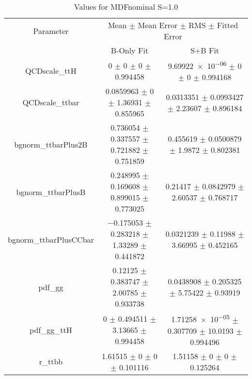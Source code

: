 \begin{table}
\centering
\caption{Values for MDFnominal S=1.0}
\begin{tabular}{ccc}
\toprule
Parameter & \multicolumn{2}{c}{Mean $\pm$ Mean Error $\pm$ RMS $\pm$ Fitted Error}\\
 & B-Only Fit & S+B Fit\\
\midrule
QCDscale\_ttH & \num{0} $\pm$ \num{0} $\pm$ \num{0} $\pm$ \num{0.994458} & \num{9.69922e-06} $\pm$ \num{0} $\pm$ \num{0} $\pm$ \num{0.994168}\\
QCDscale\_ttbar & \num{0.0859963} $\pm$ \num{0} $\pm$ \num{1.36931} $\pm$ \num{0.855965} & \num{0.0313351} $\pm$ \num{0.0993427} $\pm$ \num{2.23607} $\pm$ \num{0.896184}\\
bgnorm\_ttbarPlus2B & \num{0.736054} $\pm$ \num{0.337557} $\pm$ \num{0.721882} $\pm$ \num{0.751859} & \num{0.455619} $\pm$ \num{0.0500879} $\pm$ \num{1.9872} $\pm$ \num{0.802381}\\
bgnorm\_ttbarPlusB & \num{0.248995} $\pm$ \num{0.169608} $\pm$ \num{0.899015} $\pm$ \num{0.773025} & \num{0.21417} $\pm$ \num{0.0842979} $\pm$ \num{2.60537} $\pm$ \num{0.768717}\\
bgnorm\_ttbarPlusCCbar & \num{-0.175053} $\pm$ \num{0.283218} $\pm$ \num{1.33289} $\pm$ \num{0.441872} & \num{0.0321239} $\pm$ \num{0.11988} $\pm$ \num{3.66995} $\pm$ \num{0.452165}\\
pdf\_gg & \num{0.12125} $\pm$ \num{0.383747} $\pm$ \num{2.00785} $\pm$ \num{0.933738} & \num{0.0438908} $\pm$ \num{0.205325} $\pm$ \num{5.75422} $\pm$ \num{0.93919}\\
pdf\_gg\_ttH & \num{0} $\pm$ \num{0.494511} $\pm$ \num{3.13665} $\pm$ \num{0.994458} & \num{1.71258e-05} $\pm$ \num{0.307709} $\pm$ \num{10.0193} $\pm$ \num{0.994496}\\
r\_ttbb & \num{1.61515} $\pm$ \num{0} $\pm$ \num{0} $\pm$ \num{0.101116} & \num{1.51158} $\pm$ \num{0} $\pm$ \num{0} $\pm$ \num{0.125264}\\
\bottomrule
\end{tabular}
\end{table}